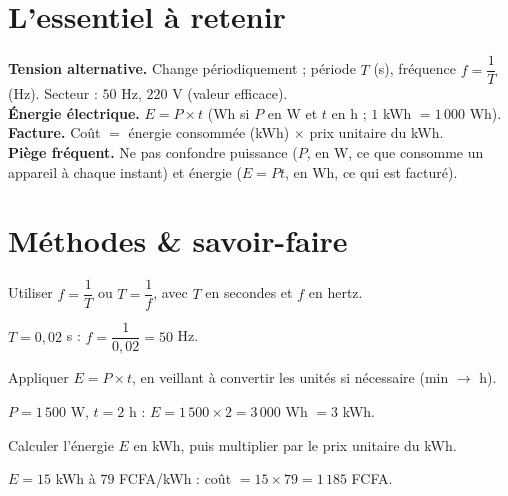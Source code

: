 \section{L'essentiel à retenir}

\begin{synthese}
\textbf{Tension alternative.} Change périodiquement ; période $T$ (s), fréquence
$f=\dfrac1T$ (Hz). Secteur : $50$ Hz, $220$ V (valeur efficace).\\[4pt]
\textbf{Énergie électrique.} $E=P\times t$ (Wh si $P$ en W et $t$ en h ; $1$ kWh
$=1\,000$ Wh).\\[4pt]
\textbf{Facture.} Coût $=$ énergie consommée (kWh) $\times$ prix unitaire du kWh.\\[4pt]
\textbf{Piège fréquent.} Ne pas confondre puissance ($P$, en W, ce que consomme un
appareil à chaque instant) et énergie ($E=Pt$, en Wh, ce qui est facturé).
\end{synthese}

\section{Méthodes \& savoir-faire}

Utiliser $f=\dfrac1T$ ou $T=\dfrac1f$, avec $T$ en secondes et $f$ en hertz.
\begin{exemple}
$T=0{,}02$ s : $f=\dfrac1{0{,}02}=50$ Hz.
\end{exemple}

Appliquer $E=P\times t$, en veillant à convertir les unités si nécessaire (min $\to$ h).
\begin{exemple}
$P=1\,500$ W, $t=2$ h : $E=1\,500\times2=3\,000$ Wh $=3$ kWh.
\end{exemple}

Calculer l'énergie $E$ en kWh, puis multiplier par le prix unitaire du kWh.
\begin{exemple}
$E=15$ kWh à $79$ FCFA/kWh : coût $=15\times79=1\,185$ FCFA.
\end{exemple}

